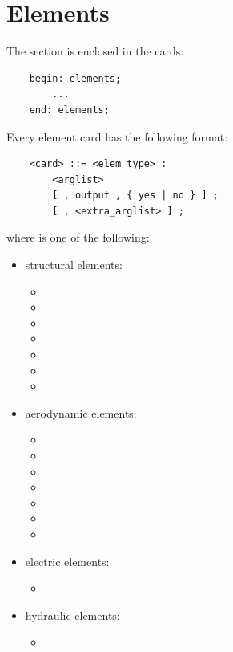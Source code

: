 \chapter{Elements}\label{sec:ELEMENTS}
The  section is enclosed in the cards:
\begin{verbatim}
    begin: elements;
        ...
    end: elements;
\end{verbatim}
Every element card has the following format:
\begin{verbatim}
    <card> ::= <elem_type> :
        <arglist>
        [ , output , { yes | no } ] ;
        [ , <extra_arglist> ] ;
\end{verbatim}
where  is one of the following:
\begin{itemize}
\item structural elements:
\begin{itemize}
\item {}
\item {}
\item {}
\item {}
\item {}
\item {}
\item {}
\end{itemize}

\item aerodynamic elements:
\begin{itemize}
\item {}
\item {}
\item {}
\item {}
\item {}
\item {}
\item {}
\end{itemize}

\item electric elements:
\begin{itemize}
\item {}
\end{itemize}

\item hydraulic elements:
\begin{itemize}
\item {}
\end{itemize}


\end{itemize}
